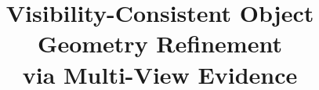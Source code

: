 \documentclass[10pt,twocolumn,a4paper]{article}
\title{Visibility-Consistent Object Geometry Refinement\\via Multi-View Evidence}
\author{}
\date{}
\begin{document}


\clearpage
\onecolumn

\end{document}
